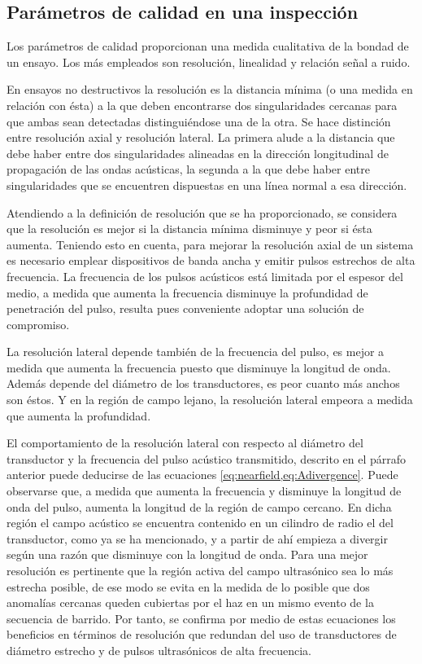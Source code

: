 \subsection{Parámetros de calidad en una inspección}\label{subsec:quality}

Los parámetros de calidad proporcionan una medida cualitativa de la bondad de un ensayo. Los más empleados son resolución, linealidad y relación señal a ruido.\par
En ensayos no destructivos la resolución es la distancia mínima (o una medida en relación con ésta) a la que deben encontrarse dos singularidades cercanas para que ambas sean detectadas distinguiéndose una de la otra. Se hace distinción entre resolución axial y resolución lateral. La primera alude a la distancia que debe haber entre dos singularidades alineadas en la dirección longitudinal de propagación de las ondas acústicas, la segunda a la que debe haber entre singularidades que se encuentren dispuestas en una línea normal a esa dirección.\par
Atendiendo a la definición de resolución que se ha proporcionado, se considera que la resolución es mejor si la distancia mínima disminuye y peor si ésta aumenta. Teniendo esto en cuenta, para mejorar la resolución axial de un sistema es necesario emplear dispositivos de banda ancha y emitir pulsos estrechos de alta frecuencia. La frecuencia de los pulsos acústicos está limitada por el espesor del medio, a medida que aumenta la frecuencia disminuye la profundidad de penetración del pulso, resulta pues conveniente adoptar una solución de compromiso.\par
La resolución lateral depende también de la frecuencia del pulso, es mejor a medida que aumenta la frecuencia puesto que disminuye la longitud de onda. Además depende del diámetro de los transductores, es peor cuanto más anchos son éstos. Y en la región de campo lejano, la resolución lateral empeora a medida que aumenta la profundidad.\par
El comportamiento de la resolución lateral con respecto al diámetro del transductor y la frecuencia del pulso acústico transmitido, descrito en el párrafo anterior puede deducirse de las ecuaciones \cref{eq:nearfield,eq:Adivergence}. Puede observarse que, a medida que aumenta la frecuencia y disminuye la longitud de onda del pulso, aumenta la longitud de la región de campo cercano. En dicha región el campo acústico se encuentra contenido en un cilindro de radio el del transductor, como ya se ha mencionado, y a partir de ahí empieza a divergir según una razón que disminuye con la longitud de onda. Para una mejor resolución es pertinente que la región activa del campo ultrasónico sea lo más estrecha posible, de ese modo se evita en la medida de lo posible que dos anomalías cercanas queden cubiertas por el haz en un mismo evento de la secuencia de barrido. Por tanto, se confirma por medio de estas ecuaciones los beneficios en términos de resolución que redundan del uso de transductores de diámetro estrecho y de pulsos ultrasónicos de alta frecuencia.\par
